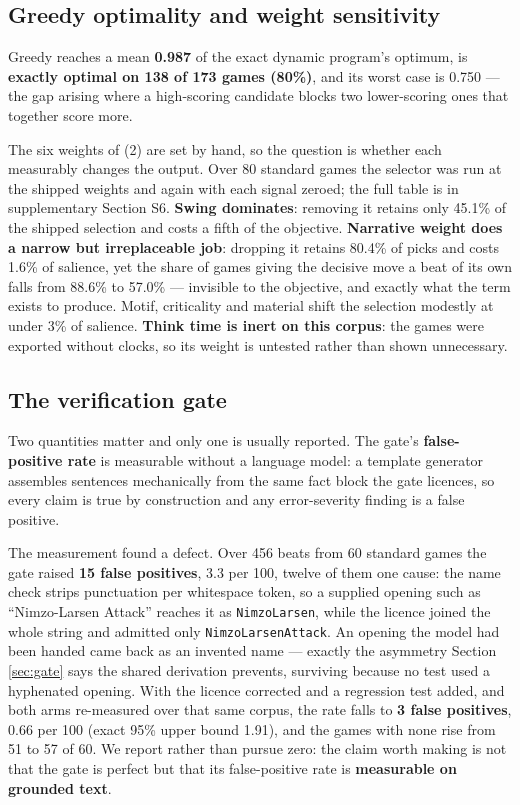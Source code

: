 \documentclass[conference]{IEEEtran}
\begin{document}
\subsection{Greedy optimality and weight sensitivity}
\label{sec:optimality}

Greedy reaches a mean \textbf{0.987} of the exact dynamic program's optimum,
is \textbf{exactly optimal on 138 of 173 games (80\%)}, and its worst case
is 0.750 --- the gap arising where a high-scoring candidate blocks two
lower-scoring ones that together score more.

The six weights of (2) are set by hand, so the question is whether each
measurably changes the output. Over 80 standard games the selector was run
at the shipped weights and again with each signal zeroed; the full table is
in supplementary Section S6. \textbf{Swing dominates}: removing it retains
only 45.1\% of the shipped selection and costs a fifth of the objective.
\textbf{Narrative weight does a narrow but irreplaceable job}: dropping it
retains 80.4\% of picks and costs 1.6\% of salience, yet the share of games
giving the decisive move a beat of its own falls from 88.6\% to 57.0\% ---
invisible to the objective, and exactly what the term exists to produce.
Motif, criticality and material shift the selection modestly at under 3\% of
salience. \textbf{Think time is inert on this corpus}: the games were
exported without clocks, so its weight is untested rather than shown
unnecessary.

\subsection{The verification gate}
\label{sec:gate-results}

Two quantities matter and only one is usually reported. The gate's
\textbf{false-positive rate} is measurable without a language model: a
template generator assembles sentences mechanically from the same fact block
the gate licences, so every claim is true by construction and any
error-severity finding is a false positive.

The measurement found a defect. Over 456 beats from 60 standard games the
gate raised \textbf{15 false positives}, 3.3 per 100, twelve of them one
cause: the name check strips punctuation per whitespace token, so a supplied
opening such as ``Nimzo-Larsen Attack'' reaches it as \texttt{NimzoLarsen},
while the licence joined the whole string and admitted only
\texttt{NimzoLarsenAttack}. An opening the model had been handed came back
as an invented name --- exactly the asymmetry Section \ref{sec:gate} says
the shared derivation prevents, surviving because no test used a hyphenated
opening. With the licence corrected and a regression test added, and both
arms re-measured over that same corpus, the rate falls to \textbf{3 false
positives}, 0.66 per 100 (exact 95\% upper bound 1.91), and the games with
none rise from 51 to 57 of 60. We report rather than pursue zero: the claim
worth making is not that the gate is perfect but that its false-positive
rate is \textbf{measurable on grounded text}.
\end{document}
